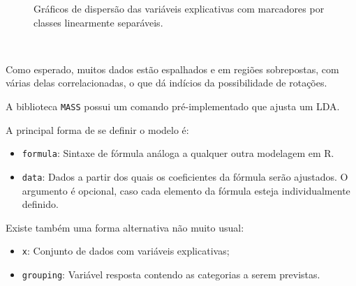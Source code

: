 \documentclass[
  a4paperpaper,
]{article}
\begin{document}
\begin{figure}[H]


\caption{\label{fig-linear2}Gráficos de dispersão das variáveis
explicativas com marcadores por classes linearmente separáveis.}

\end{figure}%

~

Como esperado, muitos dados estão espalhados e em regiões sobrepostas,
com várias delas correlacionadas, o que dá indícios da possibilidade de
rotações.

A biblioteca \texttt{MASS} possui um comando pré-implementado que ajusta
um LDA.

A principal forma de se definir o modelo é:

\begin{itemize}
\item
  \texttt{formula}: Sintaxe de fórmula análoga a qualquer outra
  modelagem em R.
\item
  \texttt{data}: Dados a partir dos quais os coeficientes da fórmula
  serão ajustados. O argumento é opcional, caso cada elemento da fórmula
  esteja individualmente definido.
\end{itemize}

Existe também uma forma alternativa não muito usual:

\begin{itemize}
\item
  \texttt{x}: Conjunto de dados com variáveis explicativas;
\item
  \texttt{grouping}: Variável resposta contendo as categorias a serem
  previstas.
\end{itemize}
\end{document}
